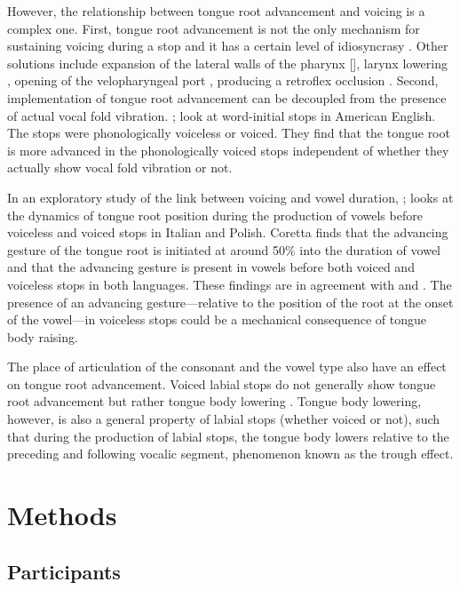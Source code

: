 \documentclass[preprint]{JASAnew}
\begin{document}
However, the relationship between tongue root advancement and voicing is
a complex one. First, tongue root advancement is not the only mechanism
for sustaining voicing during a stop
\citep{rothenberg1967, westbury1983, ohala2011} and it has a certain
level of idiosyncrasy \citep{ahn2016}. Other solutions include expansion
of the lateral walls of the pharynx {[}{]}, larynx lowering
\citep{riordan1980}, opening of the velopharyngeal port
\citep{yanagihara1966}, producing a retroflex occlusion
\citep{sprouse2008}. Second, implementation of tongue root advancement
can be decoupled from the presence of actual vocal fold vibration.
\citet{ahn2015}; \citet{ahn2016} look at word-initial stops in American
English. The stops were phonologically voiceless or voiced. They find
that the tongue root is more advanced in the phonologically voiced stops
independent of whether they actually show vocal fold vibration or not.

In an exploratory study of the link between voicing and vowel duration,
\citet{coretta2018f}; \citet{coretta2018d} looks at the dynamics of
tongue root position during the production of vowels before voiceless
and voiced stops in Italian and Polish. Coretta finds that the advancing
gesture of the tongue root is initiated at around 50\% into the duration
of vowel and that the advancing gesture is present in vowels before both
voiced and voiceless stops in both languages. These findings are in
agreement with \citet{rothenberg1967} and \citet{westbury1983}. The
presence of an advancing gesture---relative to the position of the root
at the onset of the vowel---in voiceless stops could be a mechanical
consequence of tongue body raising.

The place of articulation of the consonant and the vowel type also have
an effect on tongue root advancement. Voiced labial stops do not
generally show tongue root advancement but rather tongue body lowering
\citep{svirsky1997, vazquez-alvarez2007}. Tongue body lowering, however,
is also a general property of labial stops (whether voiced or not), such
that during the production of labial stops, the tongue body lowers
relative to the preceding and following vocalic segment, phenomenon
known as the trough effect.

\section{Methods}\label{methods}

\subsection{Participants}\label{participants}
\end{document}
